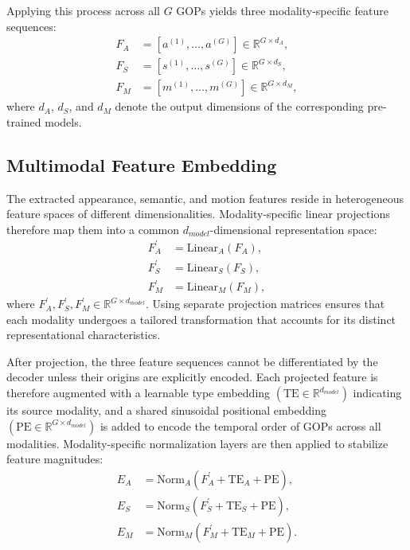 Applying this process across all $G$ GOPs yields three modality-specific feature sequences:
\begin{align}
F_A&=\left[a^{\left(1\right)},\ldots,a^{\left(G\right)}\right]\in\mathbb{R}^{G\times d_A},\\
F_S&=\left[s^{\left(1\right)},\ldots,s^{\left(G\right)}\right]\in\mathbb{R}^{G\times d_S},\\
F_M&=\left[m^{\left(1\right)},\ldots,m^{\left(G\right)}\right]\in\mathbb{R}^{G\times d_M},
\end{align}
where $d_A$, $d_S$, and $d_M$ denote the output dimensions of the corresponding pre-trained models.


\subsection{Multimodal Feature Embedding}
\label{subsec:subsec_43_feat_emb}
The extracted appearance, semantic, and motion features reside in heterogeneous feature spaces of different dimensionalities. Modality-specific linear projections therefore map them into a common $d_{model}$-dimensional representation space:
\begin{align}
F_A^\prime&={\mathrm{Linear}}_A(F_A),\\
F_S^\prime&={\mathrm{Linear}}_S(F_S),\\
F_M^\prime&={\mathrm{Linear}}_M(F_M),
\end{align}
where $F_A^\prime,F_S^\prime,F_M^\prime\in\mathbb{R}^{G\times d_{model}}$. Using separate projection matrices ensures that each modality undergoes a tailored transformation that accounts for its distinct representational characteristics.

After projection, the three feature sequences cannot be differentiated by the decoder unless their origins are explicitly encoded. Each projected feature is therefore augmented with a learnable type embedding \mbox{$\left(\mathrm{TE}\in\mathbb{R}^{d_{model}}\right)$} indicating its source modality, and a shared sinusoidal positional embedding \mbox{$\left(\mathrm{PE}\in\mathbb{R}^{G\times d_{model}}\right)$} is added to encode the temporal order of GOPs across all modalities. Modality-specific normalization layers are then applied to stabilize feature magnitudes:
\begin{align}
E_A&={\mathrm{Norm}}_A(F_A^\prime+{\mathrm{TE}}_A+\mathrm{PE}),\\
E_S&={\mathrm{Norm}}_S(F_S^\prime+{\mathrm{TE}}_S+\mathrm{PE}),\\
E_M&={\mathrm{Norm}}_M(F_M^\prime+{\mathrm{TE}}_M+\mathrm{PE}).
\end{align}

